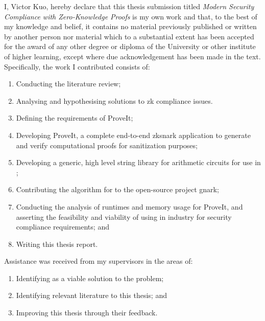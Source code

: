
\begin{declaration}
\vspace{-3em}
I, Victor Kuo, hereby declare that this thesis submission titled \emph{Modern Security Compliance with Zero-Knowledge Proofs} is my own work and that, to the best of my knowledge and belief, it contains no material previously published or written by another person nor material which to a substantial extent has been accepted for the award of any other degree or diploma of the University or other institute of higher learning, except where due acknowledgement has been made in the text.  Specifically, the work I contributed consists of:

\vspace{-1em}

\begin{enumerate}
    \item Conducting the literature review;
    \item Analysing and hypothesising solutions to \acrlong{zk} compliance issues. 
    \item Defining the requirements of \gls{ProveIt};
    \item Developing \gls{ProveIt}, a complete end-to-end \acrshort{zksnark} application to generate and verify computational proofs for sanitization purposes;
    \item Developing a generic, high level string library for arithmetic circuits for use in ;
    \item Contributing the algorithm for  to the open-source project \gls{gnark};
    \item Conducting the analysis of runtimes and memory usage for \gls{ProveIt}, and asserting the feasibility and viability of using  in industry for security compliance requirements; and
    \item Writing this thesis report.
\end{enumerate}

\vspace{-1em}

Assistance was received from my supervisors in the areas of:

\vspace{-1em}

\begin{enumerate}
    \item Identifying  as a viable solution to the problem;
    \item Identifying relevant literature to this thesis; and
    \item Improving this thesis through their feedback.
\end{enumerate}


\end{declaration}
